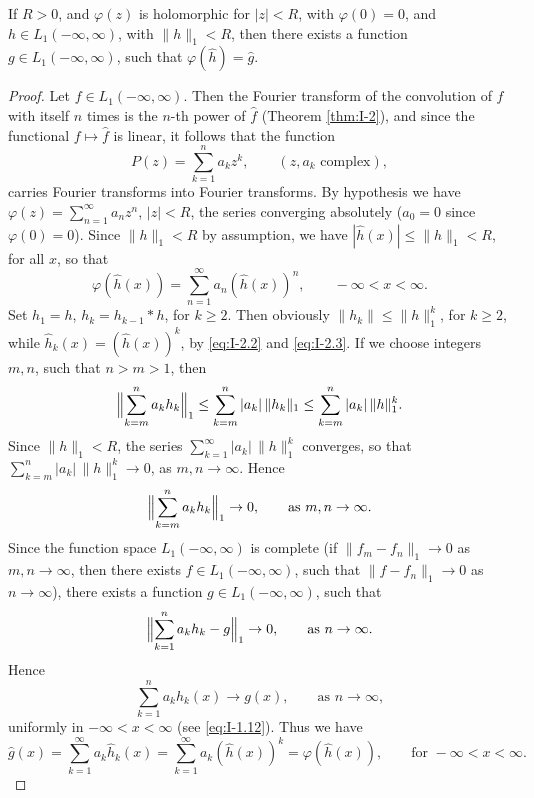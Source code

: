 \begin{theorem}\label{thm:I-20}
If $R>0$, and $\varphi(z)$ is holomorphic for $|z|<R$, with $\varphi(0)=0$, and $h\in L_1(-\infty,\infty)$, with $\|h\|_1<R$, then there exists a function $g\in L_1(-\infty,\infty)$, such that $\varphi(\widehat h)=\widehat g$.
\end{theorem}

\begin{proof}
Let $f\in L_1(-\infty,\infty)$. Then the Fourier transform of the convolution of $f$ with itself $n$ times is the $n$-th power of $\widehat f$ (Theorem \ref{thm:I-2}), and since the functional $f\mapsto\widehat f$ is linear, it follows that the function
\begin{equation*}
P(z)=\sum_{k=1}^{n}a_kz^k,\qquad(z,a_k\text{ complex}),
\end{equation*}
carries Fourier transforms into Fourier transforms. By hypothesis we have $\varphi(z)=\sum_{n=1}^{\infty}a_nz^n$, $|z|<R$, the series converging absolutely ($a_0=0$ since $\varphi(0)=0$). Since $\|h\|_1<R$ by assumption, we have $|\widehat h(x)|\le\|h\|_1<R$, for all $x$, so that
\begin{equation*}
\varphi(\widehat h(x))=\sum_{n=1}^{\infty}a_n(\widehat h(x))^n,\qquad-\infty<x<\infty.
\end{equation*}
Set $h_1=h$, $h_k=h_{k-1}*h$, for $k\ge 2$. Then obviously $\|h_k\|\le\|h\|_1^k$, for $k\ge 2$, while $\widehat h_k(x)=(\widehat h(x))^k$, by \eqref{eq:I-2.2} and \eqref{eq:I-2.3}. If we choose integers $m,n$, such that $n>m>1$, then
\begin{equation*}
\Bigl\|\sum_{k=m}^{n}a_kh_k\Bigr\|_1
\le\sum_{k=m}^{n}|a_k|\,\|h_k\|_1
\le\sum_{k=m}^{n}|a_k|\,\|h\|_1^k.
\end{equation*}
Since $\|h\|_1<R$, the series $\sum_{k=1}^{\infty}|a_k|\,\|h\|_1^k$ converges, so that $\sum_{k=m}^{n}|a_k|\,\|h\|_1^k\to 0$, as $m,n\to\infty$. Hence
\begin{equation*}
\Bigl\|\sum_{k=m}^{n}a_kh_k\Bigr\|_1\to 0,\qquad\text{as }m,n\to\infty.
\end{equation*}
Since the function space $L_1(-\infty,\infty)$ is complete (if $\|f_m-f_n\|_1\to 0$ as $m,n\to\infty$, then there exists $f\in L_1(-\infty,\infty)$, such that $\|f-f_n\|_1\to 0$ as $n\to\infty$), there exists a function $g\in L_1(-\infty,\infty)$, such that
\begin{equation*}
\Bigl\|\sum_{k=1}^{n}a_kh_k-g\Bigr\|_1\to 0,\qquad\text{as }n\to\infty.
\end{equation*}
Hence
\begin{equation*}
\sum_{k=1}^{n}a_kh_k(x)\to g(x),\qquad\text{as }n\to\infty,
\end{equation*}
uniformly in $-\infty<x<\infty$ (see \eqref{eq:I-1.12}). Thus we have
\begin{equation*}
\widehat g(x)=\sum_{k=1}^{\infty}a_k\widehat h_k(x)
=\sum_{k=1}^{\infty}a_k(\widehat h(x))^k
=\varphi(\widehat h(x)),\qquad\text{for }-\infty<x<\infty.
\end{equation*}
\end{proof}

